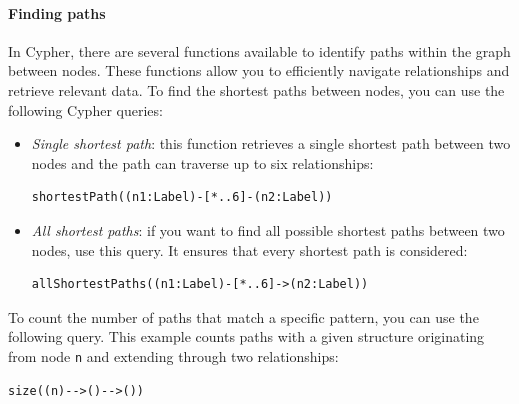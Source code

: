 \paragraph*{Finding paths}
In Cypher, there are several functions available to identify paths within the graph between nodes. 
These functions allow you to efficiently navigate relationships and retrieve relevant data.
To find the shortest paths between nodes, you can use the following Cypher queries:
\begin{itemize}
    \item \textit{Single shortest path}: this function retrieves a single shortest path between two nodes and the path can traverse up to six relationships: 
        \begin{lstlisting}[style=Cypher]
shortestPath((n1:Label)-[*..6]-(n2:Label))
        \end{lstlisting}
    \item \textit{All shortest paths}: if you want to find all possible shortest paths between two nodes, use this query. 
        It ensures that every shortest path is considered: 
        \begin{lstlisting}[style=Cypher]
allShortestPaths((n1:Label)-[*..6]->(n2:Label))
        \end{lstlisting}
\end{itemize}
To count the number of paths that match a specific pattern, you can use the following query. 
This example counts paths with a given structure originating from node \texttt{n} and extending through two relationships:
\begin{lstlisting}[style=Cypher]
size((n)-->()-->())
\end{lstlisting}